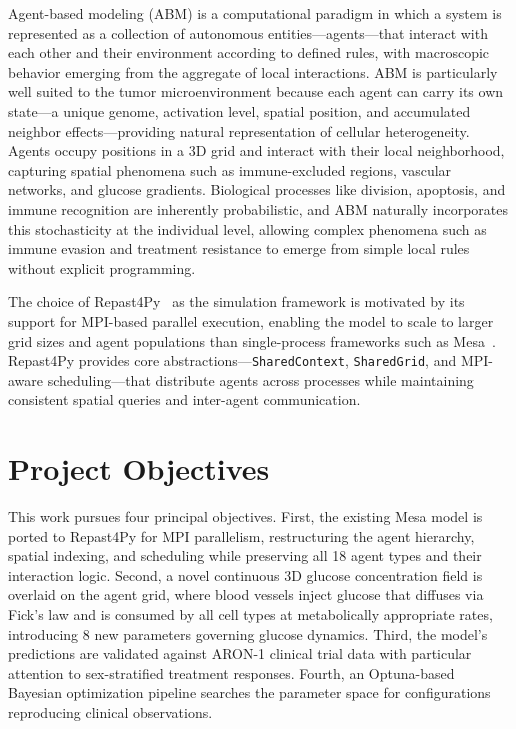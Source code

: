 Agent-based modeling (ABM) is a computational paradigm in which a system is represented as a collection of autonomous entities---agents---that interact with each other and their environment according to defined rules, with macroscopic behavior emerging from the aggregate of local interactions. ABM is particularly well suited to the tumor microenvironment because each agent can carry its own state---a unique genome, activation level, spatial position, and accumulated neighbor effects---providing natural representation of cellular heterogeneity. Agents occupy positions in a 3D grid and interact with their local neighborhood, capturing spatial phenomena such as immune-excluded regions, vascular networks, and glucose gradients. Biological processes like division, apoptosis, and immune recognition are inherently probabilistic, and ABM naturally incorporates this stochasticity at the individual level, allowing complex phenomena such as immune evasion and treatment resistance to emerge from simple local rules without explicit programming.

The choice of Repast4Py~\cite{repast4py} as the simulation framework is motivated by its support for MPI-based parallel execution, enabling the model to scale to larger grid sizes and agent populations than single-process frameworks such as Mesa~\cite{mesa}. Repast4Py provides core abstractions---\texttt{SharedContext}, \texttt{SharedGrid}, and MPI-aware scheduling---that distribute agents across processes while maintaining consistent spatial queries and inter-agent communication.

\section{Project Objectives}
\label{sec:intro_objectives}

This work pursues four principal objectives. First, the existing Mesa model is ported to Repast4Py for MPI parallelism, restructuring the agent hierarchy, spatial indexing, and scheduling while preserving all 18 agent types and their interaction logic. Second, a novel continuous 3D glucose concentration field is overlaid on the agent grid, where blood vessels inject glucose that diffuses via Fick's law and is consumed by all cell types at metabolically appropriate rates, introducing 8 new parameters governing glucose dynamics. Third, the model's predictions are validated against ARON-1 clinical trial data with particular attention to sex-stratified treatment responses. Fourth, an Optuna-based Bayesian optimization pipeline searches the parameter space for configurations reproducing clinical observations.

